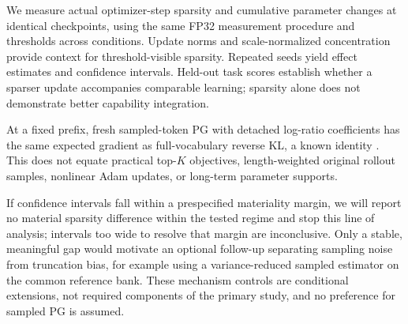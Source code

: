 We measure actual optimizer-step sparsity and cumulative parameter changes
at identical checkpoints, using the same FP32 measurement procedure and
thresholds across conditions. Update norms and scale-normalized concentration
provide context for threshold-visible sparsity. Repeated seeds yield effect
estimates and confidence intervals. Held-out task scores establish whether
a sparser update accompanies comparable learning; sparsity alone does not
demonstrate better capability integration.

At a fixed prefix, fresh sampled-token PG with detached log-ratio coefficients
has the same expected gradient as full-vocabulary reverse KL, a known identity
\citep{yu2026denseupdates,oh2026vopd}. This does not equate practical top-$K$
objectives, length-weighted original rollout samples, nonlinear Adam updates,
or long-term parameter supports.

If confidence intervals fall within a prespecified materiality margin, we
will report no material sparsity difference within the tested regime and
stop this line of analysis; intervals too wide to resolve that margin are
inconclusive. Only a stable, meaningful gap would motivate an optional
follow-up separating sampling noise from truncation bias, for example using
a variance-reduced sampled estimator on the common reference bank.
These mechanism controls are conditional extensions, not required components
of the primary study, and no preference for sampled PG is assumed.
